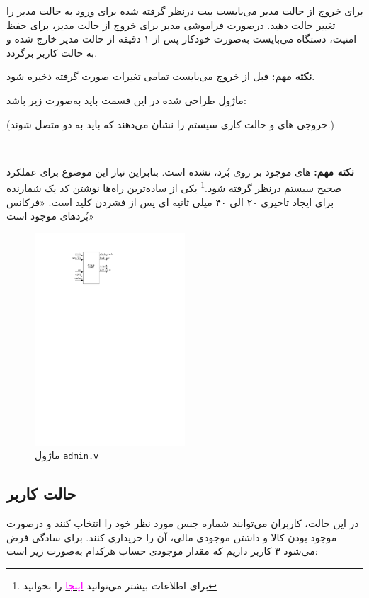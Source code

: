 \documentclass[]{article}
\begin{document}
برای خروج از حالت مدیر می‌بایست بیت درنظر گرفته شده برای ورود به حالت مدیر را تغییر حالت دهید. درصورت فراموشی مدیر برای خروج از حالت مدیر، برای حفظ امنیت، دستگاه می‌بایست به‌صورت خودکار پس از ۱ دقیقه از حالت مدیر خارج شده و به حالت کاربر برگردد.

\textbf{نکته مهم: }قبل از خروج می‌بایست تمامی تغیرات صورت گرفته ذخیره شود.



ماژول طراحی شده در این قسمت باید به‌صورت زیر باشد:

 (خروجی های  و  حالت کاری سیستم را نشان می‌دهند که باید به دو  متصل شوند.)



\newpage
\Large \textbf{\\
}


\textbf{نکته مهم:}  های موجود بر روی بُرد،  نشده است. بنابراین نیاز این موضوع برای عملکرد صحیح سیستم درنظر گرفته شود.\footnote{برای اطلاعات بیشتر می‌توانید \href{https://www.geeksforgeeks.org/switch-debounce-in-digital-circuits/}{\textcolor{magenta}{اینجا}} را بخوانید} یکی از ساده‌ترین راه‌ها نوشتن کد یک شمارنده برای ایجاد تاخیری ۲۰ الی ۴۰ میلی ثانیه ای پس از فشردن کلید است. «فرکانس بُرد‌های موجود  است»


\begin{figure}[h]
	\centering
	\includegraphics[width=0.5\textwidth]{images/admin.pdf}
	\caption{ماژول \texttt{admin.v}}
	\label{ماژول admin.v}
\end{figure}


\subsection*{{\titr حالت کاربر}} 
در این حالت، کاربران می‌توانند شماره جنس مورد نظر خود را انتخاب کنند و درصورت موجود بودن کالا و داشتن موجودی مالی، آن را خریداری کنند. برای سادگی فرض می‌شود ۳ کاربر داریم که مقدار موجودی حساب هرکدام به‌صورت زیر است:
\end{document}
